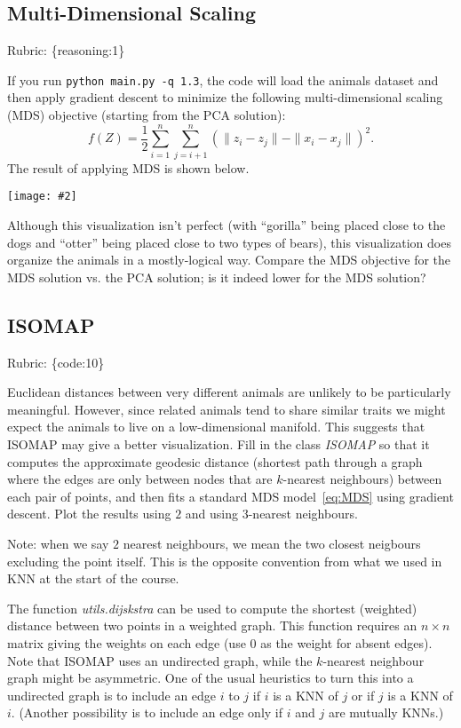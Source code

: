 \documentclass{article}
\def\rubric#1{\gre{Rubric: \{#1\}}}{}
\def\blu#1{{\color{blu}#1}}
\def\gre#1{{\color{gre}#1}}
\def\norm#1{\|#1\|}
\newcommand{\centerfig}[2]{\begin{center}\texttt{[image: \#2]}\end{center}}
\begin{document}
\subsection{Multi-Dimensional Scaling}
\rubric{reasoning:1}

If you run \verb|python main.py -q 1.3|, the code will load the animals dataset and then apply gradient descent to minimize the following multi-dimensional scaling (MDS) objective (starting from the PCA solution):
\begin{equation}
\label{eq:MDS}
f(Z) =  \frac{1}{2}\sum_{i=1}^n\sum_{j=i+1}^n (  \norm{z_i - z_j} - \norm{x_i - x_j})^2.
\end{equation}
 The result of applying MDS is shown below.
\centerfig{.5}{../figs/MDS_animals.png}
Although this visualization isn't perfect (with ``gorilla'' being placed close to the dogs and ``otter'' being placed close to two types of bears), this visualization does organize the animals in a mostly-logical way.
\blu{Compare the MDS objective for the MDS solution vs. the PCA solution; is it indeed lower for the MDS solution?} 

\subsection{ISOMAP}
\rubric{code:10}

Euclidean distances between very different animals are unlikely to be particularly meaningful.
However, since related animals tend to share similar traits we might expect the animals to live on a low-dimensional manifold.
This suggests that ISOMAP may give a better visualization.
Fill in the class \emph{ISOMAP} so that it computes the approximate geodesic distance
(shortest path through a graph where the edges are only between nodes that are $k$-nearest neighbours) between each pair of points,
and then fits a standard MDS model~\eqref{eq:MDS} using gradient descent. \blu{Plot the results using $2$ and using $3$-nearest neighbours}.

Note: when we say $2$ nearest neighbours, we mean the two closest neigbours excluding the point itself. This is the opposite convention from what we used in KNN at the start of the course.

The function \emph{utils.dijskstra} can be used to compute the shortest (weighted) distance between two points in a weighted graph.
This function requires an $n \times n$ matrix giving the weights on each edge (use $0$ as the weight for absent edges).
Note that ISOMAP uses an undirected graph, while the $k$-nearest neighbour graph might be asymmetric.
One of the usual heuristics to turn this into a undirected graph is to include an edge $i$ to $j$ if $i$ is a KNN of $j$ or if $j$ is a KNN of $i$.
(Another possibility is to include an edge only if $i$ and $j$ are mutually KNNs.)
\end{document}
